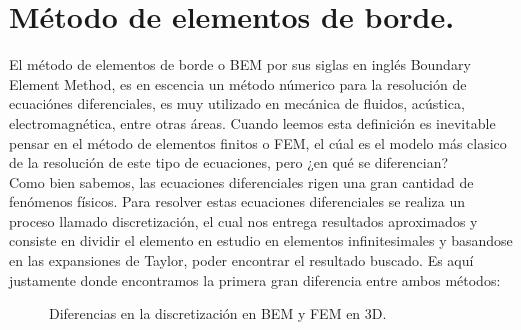 \documentclass[11pt]{article}
\begin{document}
\section{Método de elementos de borde.}\label{sec:BEM.}
\setcounter{figure}{0}
\setcounter{equation}{0}
El método de elementos de borde o BEM por sus siglas en inglés Boundary Element Method, es en escencia un método númerico para la resolución de ecuaciónes diferenciales, es muy utilizado en mecánica de fluidos, acústica, electromagnética, entre otras áreas. Cuando leemos esta definición es inevitable pensar en el método de elementos finitos o FEM, el cúal es el modelo más clasico de la resolución de este tipo de ecuaciones, pero ¿en qué se diferencian?\\
Como bien sabemos, las ecuaciones diferenciales rigen una gran cantidad de fenómenos físicos. Para resolver estas ecuaciones diferenciales se realiza un proceso llamado discretización, el cual nos entrega resultados aproximados y consiste en dividir el elemento en estudio en elementos infinitesimales y basandose en las expansiones de Taylor, poder encontrar el resultado buscado. Es aquí justamente donde encontramos la primera gran diferencia entre ambos métodos:
\begin{figure}[H]
\centering
\label{fig:Discretizacion BEM y FEM}
\caption{Diferencias en la discretización en BEM y FEM en 3D.}
\end{figure}
\end{document}
